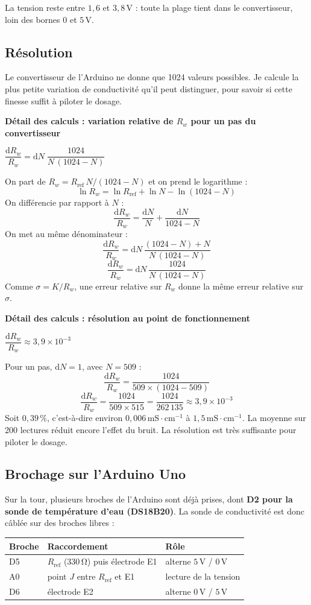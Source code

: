 \documentclass[11pt,a4paper]{article}
\newcommand{\resultat}[1]{\begin{center}{\large\color{bleuENO}$\displaystyle #1$}\end{center}}
\newenvironment{demo}[2]{\par\medskip\noindent\textbf{Détail des calculs : #1}\par\nopagebreak\resultat{#2}}{\par\medskip}
\newcommand{\calcul}[2]{\par\medskip\noindent\textbf{Détail des calculs : #1}\par\nopagebreak\resultat{#2}}
\newcommand{\ligne}{\arrayrulecolor{ligneENO}\specialrule{0.4pt}{0pt}{0pt}\arrayrulecolor{black}}
\newcommand{\U}[1]{\,\mathrm{#1}}
\begin{document}
La tension reste entre $1{,}6$ et $3{,}8\U{V}$ : toute la plage tient dans le convertisseur, loin des bornes $0$ et $5\U{V}$.

\subsection{Résolution}

Le convertisseur de l'Arduino ne donne que 1024 valeurs possibles. Je calcule la plus petite variation de conductivité qu'il peut distinguer, pour savoir si cette finesse suffit à piloter le dosage.


\begin{demo}{variation relative de $R_w$ pour un pas du convertisseur}{\dfrac{\mathrm{d}R_w}{R_w} = \mathrm{d}N \; \dfrac{1024}{N \, (1024 - N)}}
On part de $R_w = R_{\text{ref}} \, N / (1024 - N)$ et on prend le logarithme :
\[
\ln R_w = \ln R_{\text{ref}} + \ln N - \ln(1024 - N)
\]
On différencie par rapport à $N$ :
\[
\frac{\mathrm{d}R_w}{R_w} = \frac{\mathrm{d}N}{N} + \frac{\mathrm{d}N}{1024 - N}
\]
On met au même dénominateur :
\[
\frac{\mathrm{d}R_w}{R_w} = \mathrm{d}N \, \frac{(1024 - N) + N}{N \, (1024 - N)}
\]
\[
\frac{\mathrm{d}R_w}{R_w} = \mathrm{d}N \, \frac{1024}{N \, (1024 - N)}
\]
Comme $\sigma = K / R_w$, une erreur relative sur $R_w$ donne la même erreur relative sur $\sigma$.
\end{demo}

\calcul{résolution au point de fonctionnement}{\dfrac{\mathrm{d}R_w}{R_w} \approx 3{,}9 \times 10^{-3}}
Pour un pas, $\mathrm{d}N = 1$, avec $N = 509$ :
\[
\frac{\mathrm{d}R_w}{R_w} = \frac{1024}{509 \times (1024 - 509)}
\]
\[
\frac{\mathrm{d}R_w}{R_w} = \frac{1024}{509 \times 515} = \frac{1024}{262\,135} \approx 3{,}9 \times 10^{-3}
\]
Soit $0{,}39\U{\%}$, c'est-à-dire environ $0{,}006\U{mS \cdot cm^{-1}}$ à $1{,}5\U{mS \cdot cm^{-1}}$. La moyenne sur 200 lectures réduit encore l'effet du bruit. La résolution est très suffisante pour piloter le dosage.

\subsection{Brochage sur l'Arduino Uno}

Sur la tour, plusieurs broches de l'Arduino sont déjà prises, dont \textbf{D2 pour la sonde de température d'eau (DS18B20)}. La sonde de conductivité est donc câblée sur des broches libres :

\begin{center}
\begin{tabular}{l l l}
\toprule
\textbf{Broche} & \textbf{Raccordement} & \textbf{Rôle} \\
\midrule
D5 & $R_{\text{ref}}$ ($330\U{\Omega}$) puis électrode E1 & alterne $5\U{V}$ / $0\U{V}$ \\ \ligne
A0 & point $J$ entre $R_{\text{ref}}$ et E1 & lecture de la tension \\ \ligne
D6 & électrode E2 & alterne $0\U{V}$ / $5\U{V}$ \\
\bottomrule
\end{tabular}
\end{center}
\end{document}
